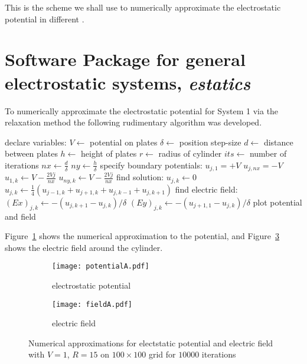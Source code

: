 \documentclass[12pt, a4paper]{article}
\begin{document}
This is the scheme we shall use to numerically approximate the electrostatic potential
in different . 

\section{Software Package for general electrostatic systems, \emph{estatics}}

To numerically approximate the electrostatic potential for System 1 via the 
relaxation method the following rudimentary algorithm was developed.

\begin{algorithm}
\begin{algorithmic}[1]
\State declare variables:
\State $V \gets$ potential on plates
\State $\delta \gets$ position step-size
\State $d \gets$ distance between plates
\State $h \gets$ height of plates
\State $r \gets$ radius of cylinder
\State $its \gets$ number of iterations
\State $nx \gets \frac{d}{\delta}$ 
\State $ny \gets \frac{h}{\delta}$ 
\State specify boundary potentials:
   \State $u_{j, 1} = +V$
   \State $u_{j, nx} = -V$
\EndFor
{}
   \State $u_{1, k} \gets V-\frac{2Vj}{nx}$
   \State $u_{ny, k} \gets V-\frac{2Vj}{nx}$
\EndFor
\State find solution:
            \State $u_{j, k} \gets 0$
         \Else
            \State $u_{j,k} \gets \frac{1}{4}(u_{j-1,k}+u_{j+1,k}+u_{j,k-1}+u_{j,k+1})$
         \EndIf
      \EndFor
   \EndFor
\EndFor
\State find electric field:
      \State $(Ex)_{j, k} \gets -\left(u_{j,k+1}-u_{j,k}\right)/\delta$
      \State $(Ey)_{j,k} \gets -\left(u_{j+1,1}-u_{j,k}\right)/\delta$
   \EndFor
\EndFor
\State plot potential and field
\EndProcedure
\end{algorithmic}
\end{algorithm}

Figure~\ref{fig:numerical} shows the numerical approximation to the potential,
and Figure~\ref{fig:field} shows the electric field around the cylinder.

\begin{figure}
\centering
\begin{subfigure}[b]{0.7\textwidth}
	\texttt{[image: potentialA.pdf]}
	\caption{electrostatic potential}
	\label{fig:numerical}
\end{subfigure}

\begin{subfigure}[b]{0.7\textwidth}
	\texttt{[image: fieldA.pdf]}
	\caption{electric field}
	\label{fig:field}
\end{subfigure}
\caption{Numerical approximations for electstatic potential and electric field with
$V=1$, $R=15$ on $100\times100$ grid for $10000$ iterations}
\end{figure}
\end{document}
